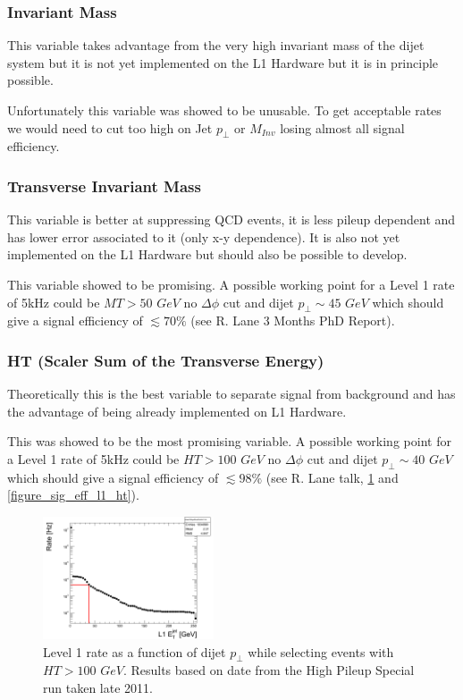 \documentclass[%
 reprint,
 amsmath,
 amssymb,
 aps,
 pra,
 showkeys
]{revtex4-1}
\begin{document}
\subsubsection{Invariant Mass}

This variable takes advantage from the very high invariant mass of the dijet system but it is not yet implemented 
on the L1 Hardware but it is in principle possible.

Unfortunately this variable was showed to be unusable. To get acceptable rates we would need to cut too high on 
Jet $p_\bot$ or $M_{Inv}$ losing almost all signal efficiency.

\subsubsection{Transverse Invariant Mass}

This variable is better at suppressing QCD events, it is less pileup dependent and has lower error associated to it
(only x-y dependence). It is also not yet implemented on the L1 Hardware but should also be possible to develop. 

This variable showed to be promising. A possible working point for a Level 1 rate 
of 5kHz could be $MT>50$ $GeV$ no $\Delta\phi$ cut and dijet $p_\bot \sim 45$ $GeV$ which should give a signal 
efficiency of $\lesssim70\%$ (see R. Lane 3 Months PhD Report).

\subsubsection{HT (Scaler Sum of the Transverse Energy)}

Theoretically this is the best variable to separate signal from background and has the advantage of being already 
implemented on L1 Hardware.

This was showed to be the most promising variable. A possible working point for a Level 1 rate of 5kHz could be $HT>100$ $GeV$ no 
$\Delta\phi$ cut and dijet $p_\bot \sim 40$ $GeV$ which should give a signal efficiency of $\lesssim98\%$ 
(see R. Lane talk, \ref{figure_PU28_5e33_RateFBDijetDEtaDPhi00HT100} and \ref{figure_sig_eff_l1_ht}).

\begin{figure}[ht]
\centering
\includegraphics[width=0.45\textwidth]{img/PU28_5e33_RateFBDijetDEtaDPhi00HT100.png} 
\caption{Level 1 rate as a function of dijet $p_\bot$ while selecting events with $HT>100$ $GeV$. Results based on
date from the High Pileup Special run taken late 2011.}
\label{figure_PU28_5e33_RateFBDijetDEtaDPhi00HT100}
\end{figure}
\end{document}
